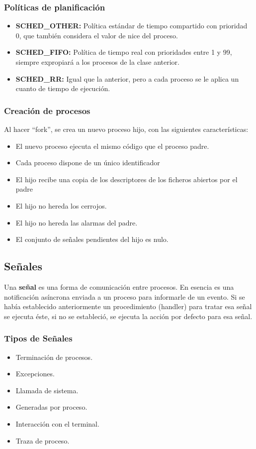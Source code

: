 \subsubsection{Políticas de planificación}
\begin{itemize}
    \item \textbf{SCHED\_OTHER: }Política estándar de tiempo compartido con prioridad 0, que también considera el valor de nice del proceso.
    \item \textbf{SCHED\_FIFO: }Política de tiempo real con prioridades entre 1 y 99, siempre expropiará a los procesos de la clase anterior.
    \item \textbf{SCHED\_RR: }Igual que la anterior, pero a cada proceso se le aplica un cuanto de tiempo de ejecución.
\end{itemize}
\subsubsection{Creación de procesos}
Al hacer \enquote{fork}, se crea un nuevo proceso hijo, con las siguientes características:
\begin{itemize}
    \item El nuevo proceso ejecuta el mismo código que el proceso padre.
    \item Cada proceso dispone de un único identificador
    \item El hijo recibe una copia de los descriptores de los ficheros abiertos por el padre 
    \item El hijo no hereda los cerrojos.
    \item El hijo no hereda las alarmas del padre.
    \item El conjunto de señales pendientes del hijo es nulo.
\end{itemize}
\subsection{Señales}
Una \textbf{señal} es una forma de comunicación entre procesos. En esencia es una notificación asíncrona enviada a un proceso para informarle de un evento. Si se había establecido anteriormente un procedimiento (handler) para tratar esa señal se ejecuta éste, si no se estableció, se ejecuta la acción por defecto para esa señal.
\subsubsection{Tipos de Señales}
\begin{itemize}
    \item Terminación de procesos.
    \item Excepciones.
    \item Llamada de sistema.
    \item Generadas por proceso.
    \item Interacción con el terminal.
    \item Traza de proceso.
\end{itemize}


